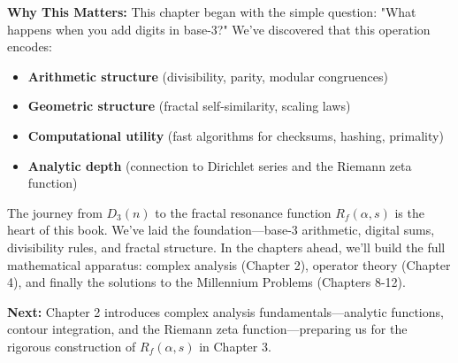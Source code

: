 \textbf{Why This Matters:} This chapter began with the simple question: "What happens when you add digits in base-3?" We've discovered that this operation encodes:
\begin{itemize}
\item \textbf{Arithmetic structure} (divisibility, parity, modular congruences)
\item \textbf{Geometric structure} (fractal self-similarity, scaling laws)
\item \textbf{Computational utility} (fast algorithms for checksums, hashing, primality)
\item \textbf{Analytic depth} (connection to Dirichlet series and the Riemann zeta function)
\end{itemize}

The journey from $D_3(n)$ to the fractal resonance function $R_f(\alpha, s)$ is the heart of this book. We've laid the foundation—base-3 arithmetic, digital sums, divisibility rules, and fractal structure. In the chapters ahead, we'll build the full mathematical apparatus: complex analysis (Chapter 2), operator theory (Chapter 4), and finally the solutions to the Millennium Problems (Chapters 8-12).

\textbf{Next:} Chapter 2 introduces complex analysis fundamentals—analytic functions, contour integration, and the Riemann zeta function—preparing us for the rigorous construction of $R_f(\alpha, s)$ in Chapter 3.

